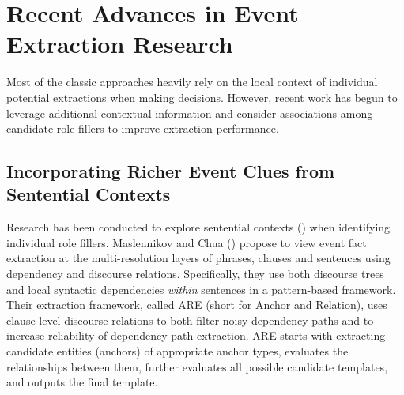 

\section{Recent Advances in Event Extraction Research}

Most of the classic approaches heavily rely on the local context 
of individual potential extractions when making decisions.
However, recent work has begun to 
leverage additional contextual information and consider  
associations among candidate role fillers 
to improve extraction performance. 

\subsection{Incorporating Richer Event Clues from Sentential Contexts}

Research has been conducted to explore 
sentential contexts (\cite{maslennikov07,gu06,patwardhan-emnlp07,patwardhan-emnlp09}) 
when identifying individual role fillers. 
Maslennikov and Chua (\cite{maslennikov07}) 
propose to view event fact extraction 
at the multi-resolution
layers of phrases, clauses and sentences
using dependency and discourse relations.
Specifically, they use both discourse trees and
local syntactic dependencies {\it within} sentences in a pattern-based
framework. 
Their extraction framework, called ARE (short for Anchor and Relation), 
uses clause level discourse relations to 
both filter noisy dependency
paths and to increase reliability
of dependency path extraction. 
ARE starts with extracting
candidate entities (anchors) of appropriate anchor
types, evaluates the relationships between them,
further evaluates all possible candidate templates,
and outputs the final template.
 
